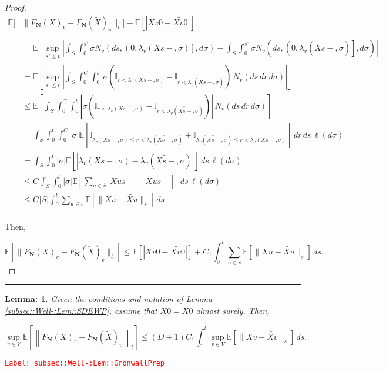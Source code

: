 \documentclass[12pt]{article}
\newcommand{\mb}{\mathbb}
\newcommand{\ov}{\overline}
\newcommand{\tr}{\textcolor{red}}
\newcommand{\labe}[1]{\tr{\texttt{Label: #1}}}
\newcommand{\lin}{\rule{\linewidth}{0.4 pt}}
\newcommand{\ex}[1]{\mb{E}\left[#1\right]}			%
\renewcommand{\v}{v}							%
\newcommand{\vv}{u}								%
\renewcommand{\S}{S}							%
\newcommand{\s}{\sigma}							%
\renewcommand{\t}{t}							%
\renewcommand{\tt}{s}							%
\newcommand{\ttt}{s'}							%
\newcommand{\X}{X}								%
\newcommand{\cl}{\ov}							%
\newcommand{\degr}{D}								%
\newcommand{\poiss}[1]{N_{#1}}						%
\newcommand{\poisses}{\mathbf{N}}				%
\newcommand{\V}{V}									%
\renewcommand{\r}{r}								%
\newcommand{\rate}[1]{\lambda_{#1}}					%
\newcommand{\const}[1]{C_{#1}}						%
\newcommand{\Sm}{\ell}								%
\newcommand{\alt}{\widetilde}						%
\newtheorem{lem}[thms]{Lemma: }
\begin{document}
\begin{proof}
\begin{align*}
\mb{E}\bigg[&\|F_\poisses(\X{}{})_\v - F_\poisses(\alt{\X{}{}})_\v\|_\t\bigg] - \ex{|\X{\v}{0} - \alt{\X{\v}{0}}|}\\
&= \ex{\sup_{\ttt \leq \t}\left|\int_\S\int_0^{\ttt} \s\poiss{\v}\left(d\tt,\left(0,\rate{\v}(\X{}{\tt-},\s)\right],d\s\right) -  \int_\S\int_0^{\ttt} \s\poiss{\v}\left(d\tt,\left(0,\rate{\v}(\alt{\X{}{\tt-}},\s)\right],d\s\right)\right|}\\
&=\ex{\sup_{\ttt\leq \t} \left|\int_\S \int_0^{\const{}} \int_0^{\ttt} \s\left(\mb{I}_{\r < \rate{\v}(\X{}{\tt-},\s)} - \mb{I}_{\r < \rate{\v}(\alt{\X{}{\tt-}},\s)}\right)\,\poiss{\v}(d\tt\,d\r\,d\s)\right|}\\
&\leq \ex{\int_\S\int_0^{\const{}}\int_0^\t \left|\s\left(\mb{I}_{\r < \rate{\v}(\X{}{\tt-},\s)} - \mb{I}_{\r < \rate{\v}(\alt{\X{}{\tt-}},\s)}\right)\right|\,\poiss{\v}(d\tt\,d\r\,d\s)}\\
&=\int_\S\int_0^\t\int_0^{\const{}} |\s|\ex{\mb{I}_{\rate{\v}(\X{}{\tt-},\s) \leq \r < \rate{\v}(\alt{\X{}{\tt-}},\s)} + \mb{I}_{\rate{\v}(\alt{\X{}{\tt-}},\s) \leq \r < \rate{\v}(\X{}{\tt-},\s)}}\,d\r\,d\tt\,\Sm(d\s)\\
&= \int_\S\int_0^\t|\s|\ex{\left|\rate{\v}(\X{}{\tt-},\s) - \rate{\v}(\alt{\X{}{\tt-}},\s)\right|}\,d\tt\,\Sm(d\s)\\
&\leq \const{}\int_\S\int_0^\t |\s| \ex{\sum_{\vv \in \cl{\v}}|\X{\vv}{\tt-} - \alt{\X{\vv}{\tt-}}|}\,d\tt\,\Sm(d\s)\\
&\leq \const{}|\S|\int_0^\t \sum_{\vv \in \cl{\v}}\ex{\|\X{\vv}{} - \alt{\X{\vv}{}}\|_\tt}\,d\tt\\
\end{align*}

Then,

\[\ex{\|F_\poisses(\X{}{})_\v - F_\poisses(\alt{\X{}{}})_\v\|_\t} \leq \ex{|\X{\v}{0} - \alt{\X{\v}{0}}|} +  \const{1}\int_0^\t \sum_{\vv\in \cl{\v}} \ex{\|\X{\vv}{} - \alt{\X{\vv}{}}\|_\tt}\,d\tt.\]

\end{proof}

\lin

\begin{lem}
Given the conditions and notation of Lemma \ref{subsec::Well-:Lem::SDEWP}, assume that \(\X{}{0} = \alt{\X{}{0}}\) almost surely. Then,

\[\sup_{\v \in \V} \ex{\left\|F_\poisses(\X{}{})_\v - F_\poisses(\alt{\X{}{}})_\v\right\|_\t} \leq (\degr+1)\const{1}\int_0^\t \sup_{\v \in \V} \ex{\|\X{\v}{} - \alt{\X{\v}{}}\|_\tt}\,d\tt.\]
\label{subsec::Well-:Lem::GronwallPrep}
\end{lem}
\labe{subsec::Well-:Lem::GronwallPrep}
\end{document}
